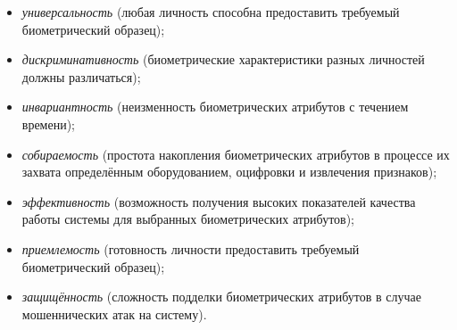 \documentclass[12pt]{book}
\begin{document}
{\begin{itemize}[topsep=1pt] \itemsep0.1em
\item \textit{универсальность} (любая личность способна предоставить требуемый биометрический образец);
\item \textit{дискриминативность} (биометрические характеристики разных личностей должны различаться);
\item \textit{инвариантность} (неизменность биометрических атрибутов с течением времени);
\item \textit{собираемость} (простота накопления биометрических атрибутов в процессе их захвата определённым оборудованием, оцифровки и извлечения признаков);
\item \textit{эффективность} (возможность получения высоких показателей качества работы системы для выбранных биометрических атрибутов);
\item \textit{приемлемость} (готовность личности предоставить требуемый биометрический образец);
\item \textit{защищённость} (сложность подделки биометрических атрибутов в случае мошеннических атак на систему).
\end{itemize}

}
\end{document}

